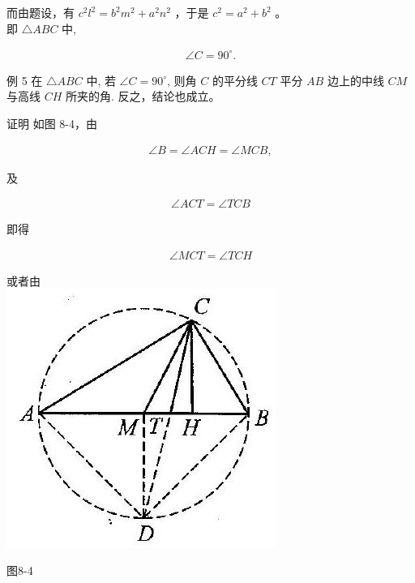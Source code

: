\documentclass[10pt]{article}
\begin{document}
而由题设，有 $c^{2} l^{2}=b^{2} m^{2}+a^{2} n^{2}$ ，于是 $c^{2}=a^{2}+b^{2}$ 。\\
即 $\triangle A B C$ 中,

\begin{align*}
\angle C=90^{\circ} .
\end{align*}

例 5 在 $\triangle A B C$ 中, 若 $\angle C=90^{\circ}$, 则角 $C$ 的平分线 $C T$ 平分 $A B$ 边上的中线 $C M$ 与高线 $C H$ 所夹的角. 反之，结论也成立。

证明 如图 8-4，由

\begin{align*}
\angle B=\angle A C H=\angle M C B,
\end{align*}

及

\begin{align*}
\angle A C T=\angle T C B
\end{align*}

即得

\begin{align*}
\angle M C T=\angle T C H
\end{align*}

或者由\\
\includegraphics[max width=\textwidth, center]{2024_10_30_2c8f45efd4a519b08e1ag-083}

图8-4
\end{document}
